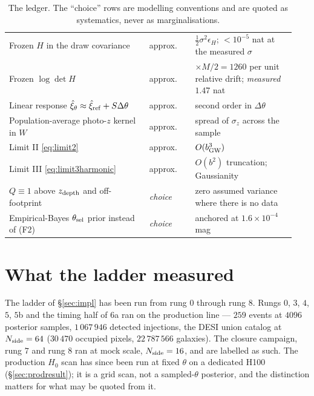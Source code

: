 \documentclass[11pt]{article}
\theoremstyle{definition}
\theoremstyle{remark}
\newcommand{\bgw}{b_{\rm GW}}
\newcommand{\zdep}{z_{\rm depth}}
\begin{document}
\begin{table}[h]
\begin{tabular}{p{0.46\linewidth}p{0.15\linewidth}p{0.33\linewidth}}
Frozen $H$ in the draw covariance & approx. & $\tfrac12\sigma^2\epsilon_H$; $<10^{-5}$ nat at the measured $\sigma$ \\
Frozen $\log\det H$ & approx. & $\times M/2=1260$ per unit relative drift; \emph{measured} $1.47$ nat \\
Linear response $\hat\xi_\theta\approx\hat\xi_{\rm ref}+S\Delta\theta$ & approx. & second order in $\Delta\theta$ \\
Population-average photo-$z$ kernel in $W$ & approx. & spread of $\sigma_z$ across the sample \\
Limit II \eqref{eq:limit2} & approx. & $O(\bgw^3)$ \\
Limit III \eqref{eq:limit3harmonic} & approx. & $O(b^2)$ truncation; Gaussianity \\
$Q\equiv1$ above $\zdep$ and off-footprint & \emph{choice} & zero assumed variance where there is no data \\
Empirical-Bayes $\theta_{\rm sel}$ prior instead of (F2) & \emph{choice} & anchored at $1.6\times10^{-4}$\,mag \\
\bottomrule
\end{tabular}
\caption{The ledger. The ``choice'' rows are modelling conventions and are quoted as
systematics, never as marginalisations.}
\end{table}

\section{What the ladder measured}
\label{sec:measured}

The ladder of \S\ref{sec:impl} has been run from rung $0$ through rung $8$.
Rungs $0$, $3$, $4$, $5$, $5$b and the timing half of $6$a ran on the production
line --- $259$ events at $4096$ posterior samples, $1\,067\,946$ detected
injections, the DESI union catalog at $N_{\rm side}=64$ ($30\,470$ occupied
pixels, $22\,787\,566$ galaxies). The closure campaign, rung $7$ and rung $8$ ran
at mock scale, $N_{\rm side}=16$, and are labelled as such. The production
$H_0$ scan has since been run at fixed $\theta$ on a dedicated H100
(\S\ref{sec:prodresult}); it is a grid scan, not a sampled-$\theta$ posterior,
and the distinction matters for what may be quoted from it.
\end{document}
